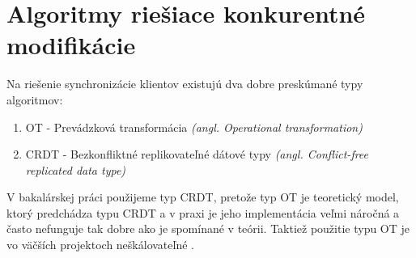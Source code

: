 \section{Algoritmy riešiace konkurentné modifikácie}
Na riešenie synchronizácie klientov existujú dva dobre preskúmané typy algoritmov:
\begin{enumerate}
  \item OT - Prevádzková transformácia \textit{(angl. Operational transformation)}
  \item CRDT - Bezkonfliktné replikovateľné dátové typy 
  \textit{(angl. Conflict-free replicated data type)}
\end{enumerate}

V bakalárskej práci použijeme typ CRDT, pretože typ OT je teoretický model, ktorý predchádza typu CRDT a v praxi
je jeho implementácia veľmi náročná a často nefunguje tak dobre ako je spomínané v teórii.
Taktiež použitie typu OT je vo väčších projektoch neškálovateľné \cite{ot_nonscalable}.
